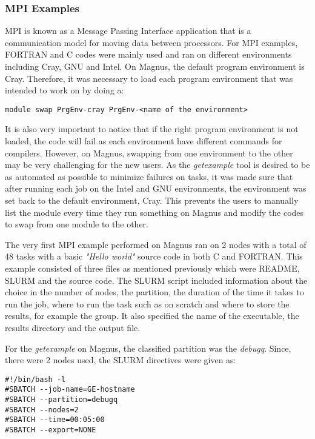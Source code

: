 \subsubsection{MPI Examples}

MPI is known as a Message Passing Interface application that is a communication model for moving data between processors. For MPI examples, FORTRAN and 
C codes were mainly used and ran on different environments including Cray, GNU and Intel. On Magnus, the default program environment is Cray. Therefore, 
it was necessary to load each program environment that was intended to work on by doing a:

\begin{tcolorbox}
\begin{Verbatim}[fontsize=\scriptsize]
module swap PrgEnv-cray PrgEnv-<name of the environment>
\end{Verbatim}
\end{tcolorbox}

It is also very important to notice that if the right program environment is not loaded, the code will fail as each environment have different commands 
for compilers. However, on Magnus, swapping from one environment to the other may be very challenging for the new users. As the \emph{getexample} tool is
desired to be as automated as possible to minimize failures on tasks, it was made sure that after running each job on the Intel and GNU environments, the
environment was set back to the default environment, Cray. This prevents the users to manually list the module every time they run something on Magnus
and modify the codes to swap from one module to the other. 

The very first MPI example performed on Magnus ran on 2 nodes with a total of 48 tasks with a basic \emph{"Hello world"} source code in both C and FORTRAN. 
This example consisted of three files as mentioned previously which were README, SLURM and the source code. The SLURM script included information about
the choice in the number of nodes, the partition, the duration of the time it takes to run the job, where to run the task such as on scratch and where
to store the results, for example the group. It also specified the name of the executable, the results directory and the output file. 

For the \emph{getexample} on Magnus, the classified partition was the \emph{debugq}. Since, there were 2 nodes used, the SLURM directives were given as:

\begin{tcolorbox}
\begin{Verbatim}[fontsize=\scriptsize]
#!/bin/bash -l
#SBATCH --job-name=GE-hostname
#SBATCH --partition=debugq
#SBATCH --nodes=2
#SBATCH --time=00:05:00
#SBATCH --export=NONE
\end{Verbatim}
\end{tcolorbox}

